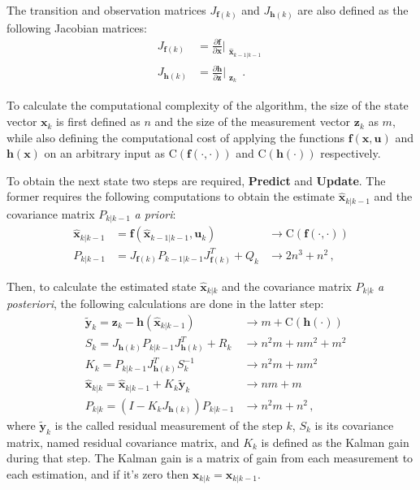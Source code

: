 The transition and observation matrices $J_{\mathbf{f}(k)}$ and $J_{\mathbf{h}(k)}$ are also defined as the following Jacobian matrices:
    \begin{align*}
        J_{\mathbf{f}(k)} &= \frac{\partial \mathbf{f}}{\partial \mathbf{x}}\Bigr|_{\substack{\mathbf{\hat{x}}_{k-1|k-1}}}\\
        J_{\mathbf{h}(k)} &= \frac{\partial \mathbf{h}}{\partial \mathbf{z}}\Bigr|_{\substack{\mathbf{z}_{k}}}\,.
    \end{align*}

\newpage

To calculate the computational complexity of the algorithm, the size of the state vector $\mathbf{x}_k$ is first defined as $n$ and the size of the measurement vector $\mathbf{z}_k$ as $m$, while also defining the computational cost of applying the functions $\mathbf{f(\mathbf{x}, \mathbf{u})}$ and $\mathbf{h}(\mathbf{x})$ on an arbitrary input as $\text{C}(\mathbf{f}(\cdot,\cdot))$ and $\text{C}(\mathbf{h}(\cdot))$ respectively.


To obtain the next state two steps are required, \textbf{Predict} and \textbf{Update}.
The former requires the following computations to obtain the estimate $\mathbf{\hat{x}}_{k|k-1}$ and the covariance matrix $P_{k|k-1}$ \textit{a priori}:
    \begin{align*}
        \mathbf{\hat{x}}_{k|k-1} &= \mathbf{f}(\mathbf{\hat{x}}_{k-1|k-1}, \mathbf{u}_k) &\rightarrow \text{C}(\mathbf{f}(\cdot, \cdot))\\
        P_{k|k-1} &= J_{\mathbf{f}(k)} P_{k-1|k-1} J_{\mathbf{f}(k)}^T + Q_k &\rightarrow 2n^3 + n^2\,,
    \end{align*}

Then, to calculate the estimated state $\mathbf{\hat{x}}_{k|k}$ and the covariance matrix $P_{k|k}$ \textit{a posteriori}, the following calculations are done in the latter step:
    \begin{align}
        \nonumber &\mathbf{\tilde{y}}_k = \mathbf{z}_k - \mathbf{h}(\mathbf{\hat{x}}_{k|k-1}) &\rightarrow m + \text{C}(\mathbf{h}(\cdot))\\
        &S_k = J_{\mathbf{h}(k)} P_{k|k-1} J_{\mathbf{h}(k)}^T + R_k &\rightarrow n^2m + nm^2 + m^2 \label{eq:ekf_Sk}\\
        &K_k = P_{k|k-1} J_{\mathbf{h}(k)}^T S_k^{-1} &\rightarrow n^2m + nm^2\label{eq:ekf_Kk}\\
        \nonumber &\mathbf{\hat{x}}_{k|k} = \mathbf{\hat{x}}_{k|k-1} + K_k \mathbf{\tilde{y}}_k &\rightarrow nm + m\\
        &P_{k|k} = (I - K_k J_{\mathbf{h}(k)}) P_{k|k-1} &\rightarrow n^2m + n^2\,,\label{eq:ekf_Pk}
    \end{align}
where $\mathbf{\tilde{y}}_k$ is the called residual measurement of the step $k$, $S_k$ is its covariance matrix, named residual covariance matrix, and $K_k$ is defined as the Kalman gain during that step.
The Kalman gain is a matrix of gain from each measurement to each estimation, and if it's zero then $\mathbf{x}_{k|k} = \mathbf{x}_{k|k-1}$.

